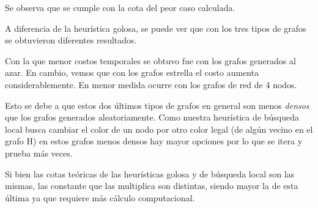 \quad

\quad Se observa que se cumple con la cota del peor caso calculada.

\quad A diferencia de la heurística golosa, se puede ver que con los tres tipos de grafos se obtuvieron diferentes resultados.

\quad Con la que menor costos temporales se obtuvo fue con los grafos generados al azar. En cambio, vemos que con los grafos estrella el costo aumenta considerablemente. En menor medida ocurre con los grafos de red de 4 nodos. 

\quad Esto se debe a que estos dos últimos tipos de grafos en general son menos \textit{densos} que los grafos generados aleatoriamente. Como nuestra heurística de búsqueda local busca cambiar el color de un nodo por otro color legal (de algún vecino en el grafo H) en estos grafos menos densos hay mayor opciones por lo que se itera y prueba más veces.

\quad Si bien las cotas teóricas de las heurísticas golosa y de búsqueda local son las mismas, las constante que las multiplica son distintas, siendo mayor la de esta última ya que requiere más cálculo computacional.